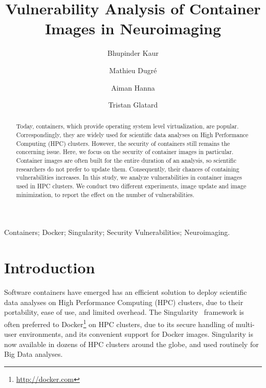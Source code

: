 \documentclass[a4paper,num-refs]{oup-contemporary}
\title{Vulnerability Analysis of Container Images in Neuroimaging}
\begin{document}
\author[1]{Bhupinder Kaur}
\author[1]{Mathieu Dugr\'e}
\author[1]{Aiman Hanna}
\author[1]{Tristan Glatard}


\maketitle

\begin{abstract}

Today, containers, which provide operating system level virtualization, are
popular. Correspondingly, they are widely used for scientific data analyses on 
High Performance Computing (HPC) clusters. However, the security of containers
still remains the concerning issue. Here, we focus on the security of container
images in particular. Container images are often built for the entire
duration of an analysis, so scientific researchers do not prefer to update
them. Consequently, their chances of containing vulnerabilities increases.  
In this study, we analyze vulnerabilities in container images used in 
HPC clusters.
We conduct two different
experiments, image update and image minimization, to report the effect 
on the number of vulnerabilities.

\end{abstract}

\begin{keywords}
Containers; Docker; Singularity; Security Vulnerabilities; Neuroimaging.
\end{keywords}


\section{Introduction}

Software containers have emerged has an efficient solution to deploy
scientific data analyses on High Performance Computing (HPC) clusters, due
to their portability, ease of use, and limited overhead. The
Singularity~\cite{kurtzer2017singularity} framework is often preferred to
Docker\footnote{\url{http://docker.com}} on HPC clusters, due to its
secure handling of multi-user environments, and its convenient support for
Docker images. Singularity is now available in dozens of HPC
clusters around the globe, and used routinely for Big Data analyses.
\end{document}
